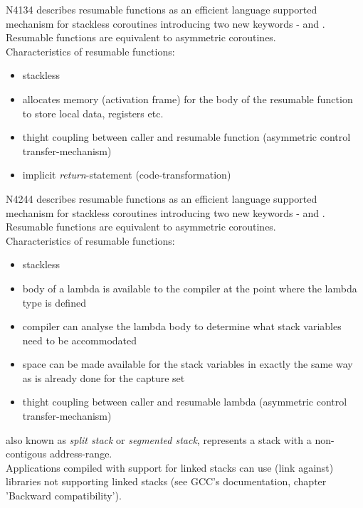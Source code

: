 N4134\cite{N4134} describes resumable functions as an efficient language
supported mechanism for stackless coroutines introducing two new keywords -
\await and \yield. Resumable functions are equivalent to asymmetric coroutines.\\
Characteristics of resumable functions:
\begin{itemize}
    \item stackless
    \item allocates memory (activation frame) for the body of the resumable
          function to store local data, registers etc.
    \item thight coupling between caller and resumable function (asymmetric
          control transfer-mechanism)
    \item implicit \textit{return}-statement\cite{N4134} (code-transformation)
\end{itemize}

N4244\cite{N4244} describes resumable functions as an efficient language
supported mechanism for stackless coroutines introducing two new keywords -
\await and \yield. Resumable functions are equivalent to asymmetric coroutines.\\
Characteristics of resumable functions:
\begin{itemize}
    \item stackless
    \item body of a lambda is available to the compiler at the point
          where the lambda type is defined
    \item compiler can analyse the lambda body to determine what stack
          variables need to be accommodated
    \item space can be made available for the stack variables in exactly the
          same way as is already done for the capture set
    \item thight coupling between caller and resumable lambda (asymmetric
          control transfer-mechanism)
\end{itemize}

also known as \textit{split stack}\cite{gccsplit} or
\textit{segmented stack}\cite{llvmseg}, represents a stack with a non-contigous
address-range.\\
Applications compiled with support for linked stacks can use (link against)
libraries not supporting linked stacks (see GCC's documentation\cite{gccsplit},
chapter 'Backward compatibility').
